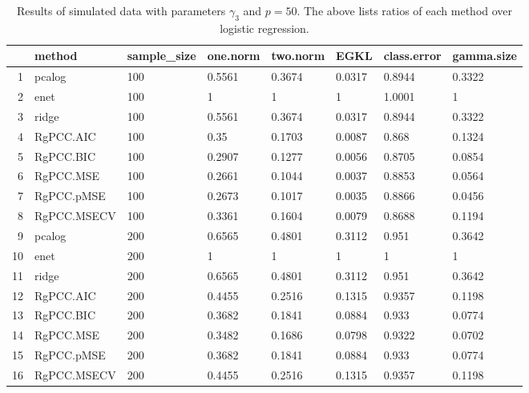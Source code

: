 \begin{table}[ht]
\centering
\begin{tabular}{rlllllll}
  \hline
 & method & sample\_size & one.norm & two.norm & EGKL & class.error & gamma.size \\ 
  \hline
1 & pcalog & 100 & 0.5561 & 0.3674 & 0.0317 & 0.8944 & 0.3322 \\ 
  2 & enet & 100 & 1 & 1 & 1 & 1.0001 & 1 \\ 
  3 & ridge & 100 & 0.5561 & 0.3674 & 0.0317 & 0.8944 & 0.3322 \\ 
  4 & RgPCC.AIC & 100 & 0.35 & 0.1703 & 0.0087 & 0.868 & 0.1324 \\ 
  5 & RgPCC.BIC & 100 & 0.2907 & 0.1277 & 0.0056 & 0.8705 & 0.0854 \\ 
  6 & RgPCC.MSE & 100 & 0.2661 & 0.1044 & 0.0037 & 0.8853 & 0.0564 \\ 
  7 & RgPCC.pMSE & 100 & 0.2673 & 0.1017 & 0.0035 & 0.8866 & 0.0456 \\ 
  8 & RgPCC.MSECV & 100 & 0.3361 & 0.1604 & 0.0079 & 0.8688 & 0.1194 \\ 
  9 & pcalog & 200 & 0.6565 & 0.4801 & 0.3112 & 0.951 & 0.3642 \\ 
  10 & enet & 200 & 1 & 1 & 1 & 1 & 1 \\ 
  11 & ridge & 200 & 0.6565 & 0.4801 & 0.3112 & 0.951 & 0.3642 \\ 
  12 & RgPCC.AIC & 200 & 0.4455 & 0.2516 & 0.1315 & 0.9357 & 0.1198 \\ 
  13 & RgPCC.BIC & 200 & 0.3682 & 0.1841 & 0.0884 & 0.933 & 0.0774 \\ 
  14 & RgPCC.MSE & 200 & 0.3482 & 0.1686 & 0.0798 & 0.9322 & 0.0702 \\ 
  15 & RgPCC.pMSE & 200 & 0.3682 & 0.1841 & 0.0884 & 0.933 & 0.0774 \\ 
  16 & RgPCC.MSECV & 200 & 0.4455 & 0.2516 & 0.1315 & 0.9357 & 0.1198 \\ 
   \hline
\end{tabular}
\caption{Results of simulated data with parameters $\gamma_3$ and $p =50$. The above lists ratios of each method over logistic regression.} 
\label{fig-3-leadnew-50-metrics-pratio}
\end{table}
